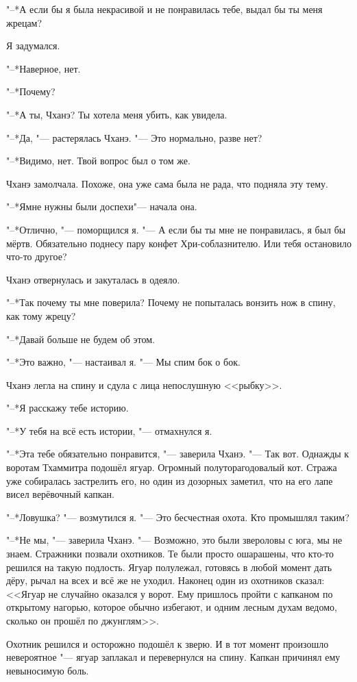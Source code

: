 "--*А если бы я была некрасивой и не понравилась тебе, выдал бы ты меня жрецам?

Я задумался.

"--*Наверное, нет.

"--*Почему?

"--*А ты, Чханэ?
Ты хотела меня убить, как увидела.

"--*Да, "--- растерялась Чханэ.
"--- Это нормально, разве нет?

"--*Видимо, нет.
Твой вопрос был о том же.

Чханэ замолчала.
Похоже, она уже сама была не рада, что подняла эту тему.

"--*Я\ldotst мне нужны были доспехи\ldotst "--- начала она.

"--*Отлично, "--- поморщился я.
"--- А если бы ты мне не понравилась, я был бы мёртв.
Обязательно поднесу пару конфет Хри-соблазнителю.
Или тебя остановило что-то другое?

Чханэ отвернулась и закуталась в одеяло.

"--*Так почему ты мне поверила?
Почему не попыталась вонзить нож в спину, как тому жрецу?

"--*Давай больше не будем об этом.

"--*Это важно, "--- настаивал я.
"--- Мы спим бок о бок.

Чханэ легла на спину и сдула с лица непослушную <<рыбку>>.

"--*Я расскажу тебе историю.

"--*У тебя на всё есть истории, "--- отмахнулся я.

"--*Эта тебе обязательно понравится, "--- заверила Чханэ.
"--- Так вот.
Однажды к воротам Тхаммитра подошёл ягуар.
Огромный полуторагодовалый кот.
Стража уже собиралась застрелить его, но один из дозорных заметил, что на его лапе висел верёвочный капкан.

"--*Ловушка? "--- возмутился я.
"--- Это бесчестная охота.
Кто промышлял таким?

"--*Не мы, "--- заверила Чханэ.
"--- Возможно, это были звероловы с юга, мы не знаем.
Стражники позвали охотников.
Те были просто ошарашены, что кто-то решился на такую подлость.
Ягуар полулежал, готовясь в любой момент дать дёру, рычал на всех и всё же не уходил.
Наконец один из охотников сказал: <<Ягуар не случайно оказался у ворот.
Ему пришлось пройти с капканом по открытому нагорью, которое обычно избегают, и одним лесным духам ведомо, сколько он прошёл по джунглям>>.

Охотник решился и осторожно подошёл к зверю.
И в тот момент произошло невероятное "--- ягуар заплакал и перевернулся на спину.
Капкан причинял ему невыносимую боль.

